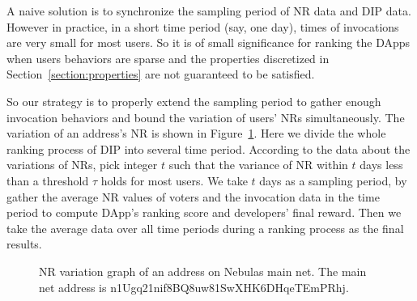   A naive solution is to synchronize the sampling period of NR data and DIP data. However in practice, in a short time period (say, one day), times of invocations are very small for most users. So it is of small significance for ranking the DApps when users behaviors are sparse and the properties discretized  in Section~\ref{section:properties} are not guaranteed to be satisfied.

  So our strategy is to properly extend the sampling period to gather enough invocation behaviors and bound the variation of users' NRs simultaneously. The variation of  an address's NR is shown in Figure~\ref{fig:nr}. Here we divide the whole ranking process of DIP into several time period. According to the data about the variations of NRs, pick integer $t$ such that the variance of NR within $t$ days less than a threshold $\tau$ holds for most users. We take $t$ days as a sampling period, by gather the average NR values of voters and the invocation data in the time period to compute DApp's ranking score and developers' final reward. Then we take the average data over all time periods during a ranking process as the final  results.

  \begin{figure}
  	\label{fig:nr}
  	\centering
  	
  	\caption{NR variation graph of an address on Nebulas main net. The main net address is n1Ugq21nif8BQ8uw81SwXHK6DHqeTEmPRhj.}
  \end{figure}



